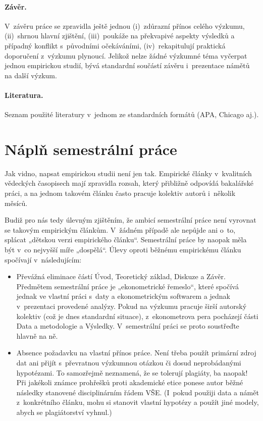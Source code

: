 \documentclass[11pt,a4paper]{article}
\begin{document}
\paragraph{Závěr.} V~závěru práce se zpravidla ještě jednou (i)~zdůrazní přínos celého výzkumu, (ii)~shrnou hlavní zjištění, (iii)~poukáže na překvapivé aspekty výsledků a případný konflikt s~původními očekáváními, (iv)~rekapitulují praktická doporučení z~výzkumu plynoucí. Jelikož nelze žádné výzkumné téma vyčerpat jednou empirickou studií, bývá standardní součástí závěru i~prezentace námětů na další výzkum.

\paragraph{Literatura.} Seznam použité literatury v~jednom ze standardních formátů (APA, Chicago aj.).

\section{Náplň semestrální práce}
\label{sec:napln}

Jak vidno, napsat empirickou studii není jen tak. Empirické články v~kvalitních vědeckých časopisech mají zpravidla rozsah, který přibližně odpovídá bakalářské práci, a na jednom takovém článku často pracuje kolektiv autorů i~několik měsíců.

Budiž pro nás tedy úlevným zjištěním, že ambicí semestrální práce není vyrovnat se takovým empirickým článkům. V~žádném případě ale nepůjde ani o~to, splácat „dětskou verzi empirického článku“. Semestrální práce by naopak měla být v~co nejvyšší míře „dospělá“. Úlevy oproti běžnému empirickému článku spočívají v~následujícím:
\begin{itemize}[itemsep=1pt, topsep=2pt]
  \item Převážná eliminace částí Úvod, Teoretický základ, Diskuze a Závěr. Předmětem semestrální práce je „ekonometrické řemeslo“, které spočívá jednak ve vlastní práci s~daty a ekonometrickým softwarem a jednak v~prezentaci provedené analýzy. Pokud na výzkumu pracuje širší autorský kolektiv (což je dnes standardní situace), z~ekonometrova pera pocházejí části Data a metodologie a Výsledky. V~semestrální práci se proto soustřeďte hlavně na ně.
  \item Absence požadavku na vlastní přínos práce. Není třeba použít primární zdroj dat ani přijít s~převratnou výzkumnou otázkou či dosud neprobádanými hypotézami. To samozřejmě neznamená, že se tolerují plagiáty, ba naopak! Při jakékoli známce prohřešků proti akademické etice ponese autor běžné následky stanovené disciplinárním řádem VŠE. (I~pokud použiji data a námět z~konkrétního článku, mohu si stanovit vlastní hypotézy a použít jiné modely, abych se plagiátorství vyhnul.)
\end{itemize}
\end{document}
